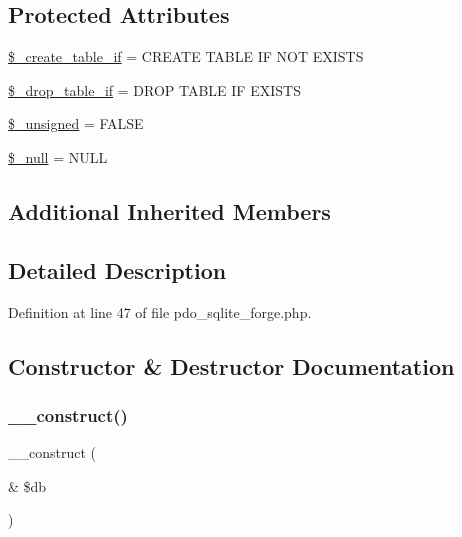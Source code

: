 \subsection*{Protected Attributes}
\begin{DoxyCompactItemize}
\item 
\mbox{\hyperlink{class_c_i___d_b__pdo__sqlite__forge_a2f6484fcb8d1dc3eef67a637227cd583}{\$\+\_\+create\+\_\+table\+\_\+if}} = \textquotesingle{}C\+R\+E\+A\+TE T\+A\+B\+LE IF N\+OT E\+X\+I\+S\+TS\textquotesingle{}
\item 
\mbox{\hyperlink{class_c_i___d_b__pdo__sqlite__forge_a92a8a9145a7fc91e252e58d019373581}{\$\+\_\+drop\+\_\+table\+\_\+if}} = \textquotesingle{}D\+R\+OP T\+A\+B\+LE IF E\+X\+I\+S\+TS\textquotesingle{}
\item 
\mbox{\hyperlink{class_c_i___d_b__pdo__sqlite__forge_aae977ae6d61fa183f0b25422b6ddc31c}{\$\+\_\+unsigned}} = F\+A\+L\+SE
\item 
\mbox{\hyperlink{class_c_i___d_b__pdo__sqlite__forge_ae58fe6a5104d4a069a49b27533ce808f}{\$\+\_\+null}} = \textquotesingle{}N\+U\+LL\textquotesingle{}
\end{DoxyCompactItemize}
\subsection*{Additional Inherited Members}


\subsection{Detailed Description}


Definition at line 47 of file pdo\+\_\+sqlite\+\_\+forge.\+php.



\subsection{Constructor \& Destructor Documentation}
\mbox{\label{class_c_i___d_b__pdo__sqlite__forge_aaf2ef772755ec6f361d44e16cc9ffd69}} 
\subsubsection{\texorpdfstring{\_\_construct()}{\_\_construct()}}
{\footnotesize\ttfamily \+\_\+\+\_\+construct (\begin{DoxyParamCaption}\item[{\&}]{\$db }\end{DoxyParamCaption})}

